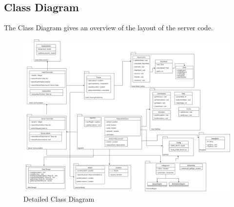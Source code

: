 \documentclass[11pt]{article}
\begin{document}
\subsection{Class Diagram}
The Class Diagram gives an overview of the layout of the server code.
\begin{figure}
   \centering
   \includegraphics[width=\textwidth]{diagram/class_diagram_final2.png} %
   \caption{Detailed Class Diagram}
   \label{fig:dcd}
\end{figure}
\end{document}
